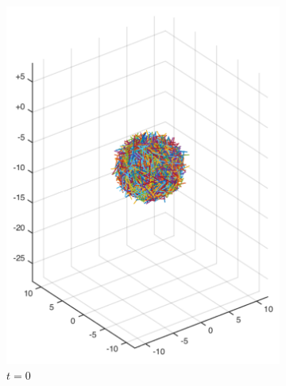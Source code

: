 \begin{figure}[!htbp]
  \centering
  \begin{subfigure}[h]{0.4\textwidth}
    \centering
    \includegraphics[width=\textwidth]{img/state_00000.pdf}
    \caption{$t=0$}\label{fig:sphere_simulation_1a}
  \end{subfigure}
  \begin{subfigure}[h]{0.4\textwidth}
    \centering

\end{subfigure}
\end{figure}
